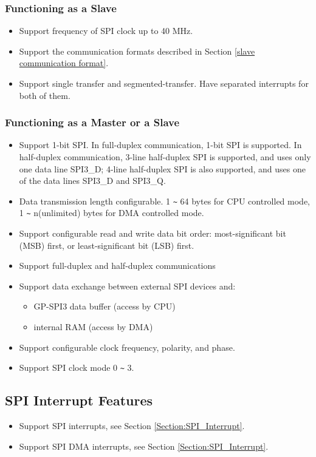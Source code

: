 \documentclass[main\_\_EN.tex]{subfiles}
\begin{document}
\subsubsection{Functioning as a Slave}
  \begin{itemize}
    \item Support frequency of SPI clock up to 40 MHz.
    \item Support the communication formats described in Section \ref{slave communication format}.
    \item Support single transfer and segmented-transfer. Have separated interrupts for both of them.
  \end{itemize}

\subsubsection{Functioning as a Master or a Slave}
  \begin{itemize}
    \item Support 1-bit SPI. In full-duplex communication, 1-bit SPI is supported. In half-duplex communication, 3-line half-duplex SPI is supported, and uses only one data line SPI3\_D; 4-line half-duplex SPI is also supported, and uses one of the data lines SPI3\_D and SPI3\_Q.

    \item Data transmission length configurable. 1 \verb+~+ 64 bytes for CPU controlled mode, 1 \verb+~+ n(unlimited) bytes for DMA controlled mode.
    \item Support configurable read and write data bit order: most-significant bit (MSB) first, or least-significant bit (LSB) first.
    \item Support full-duplex and half-duplex communications
    \item Support data exchange between external SPI devices and:
      \begin{itemize}
        \item GP-SPI3 data buffer (access by CPU)
        \item internal RAM (access by DMA)
      \end{itemize}

    \item Support configurable clock frequency, polarity, and phase.
    \item Support SPI clock mode 0 \verb+~+ 3.
  \end{itemize}

\subsection{SPI Interrupt Features}
\begin{itemize}
    \item Support SPI interrupts, see Section \ref{Section:SPI_Interrupt}.
    \item Support SPI DMA interrupts, see Section \ref{Section:SPI_Interrupt}.
\end{itemize}
\end{document}
